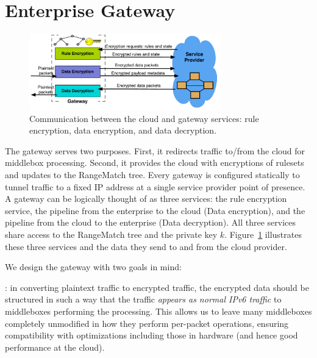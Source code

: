 \section{Enterprise Gateway}

\label{sec:gateway}

\begin{figure}[t]
  \centering
  \includegraphics[width=3.25in]{fig/gateway2cloud}
  \caption[]{\label{fig:gatewaymeta} Communication between the cloud and gateway services: rule encryption, data encryption, and data decryption.} 
\end{figure}



The gateway serves two purposes. First, it redirects traffic to/from the cloud for middlebox processing. Second, it provides the cloud with encryptions of rulesets and updates to the RangeMatch tree.
Every gateway is configured statically to tunnel traffic to a fixed IP address at a single service provider point of presence.
A gateway can be logically thought of as three services: the rule encryption service, the pipeline from the enterprise to the cloud (Data encryption), and the pipeline from the cloud to the enterprise (Data decryption). 
All three services share access to the RangeMatch tree and the private key $k$.
Figure~\ref{fig:gatewaymeta} illustrates  these three services and the data they send to and from the cloud provider.

We design the gateway with two goals in mind: 

: in converting plaintext traffic to encrypted traffic, the encrypted data should be structured in such a way that the traffic {\it appears as normal IPv6 traffic} to middleboxes performing the processing. This allows us to leave many middleboxes completely unmodified in how they perform per-packet operations, ensuring compatibility with optimizations including those in hardware (and hence good performance at the cloud). 


